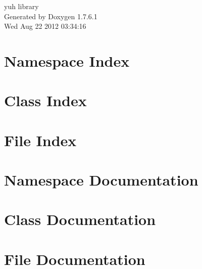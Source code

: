 \documentclass[a4paper]{book}
\begin{document}
\hypersetup{pageanchor=false,citecolor=blue}
\begin{titlepage}
\vspace*{7cm}
\begin{center}
{\Large yuh library }\\
\vspace*{1cm}
{\large \-Generated by Doxygen 1.7.6.1}\\
\vspace*{0.5cm}
{\small Wed Aug 22 2012 03:34:16}\\
\end{center}
\end{titlepage}
\clearemptydoublepage
{}
\tableofcontents
\clearemptydoublepage
{}
\hypersetup{pageanchor=true,citecolor=blue}
\chapter{\-Namespace \-Index}

\chapter{\-Class \-Index}

\chapter{\-File \-Index}

\chapter{\-Namespace \-Documentation}


\chapter{\-Class \-Documentation}




\chapter{\-File \-Documentation}







\printindex
\end{document}
